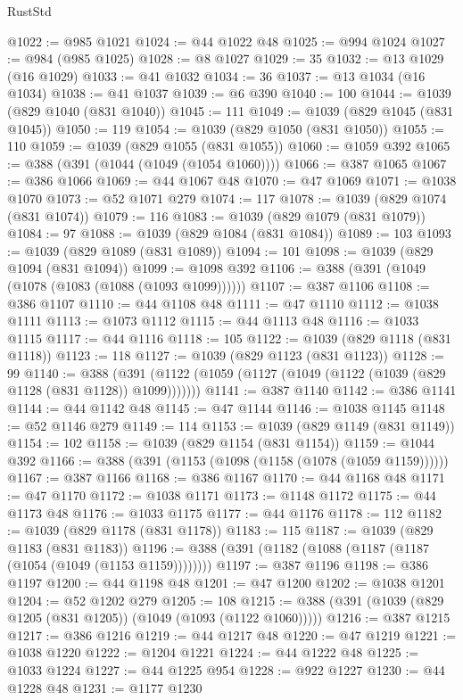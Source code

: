 \begin{lexlean}{RustStd}
\begin{coremodule}
@1022 := @985 @1021
@1024 := @44 @1022 @48
@1025 := @994 @1024
@1027 := @984 (@985 @1025)
@1028 := @8 @1027
@1029 := 35
@1032 := @13 @1029 (@16 @1029)
@1033 := @41 @1032
@1034 := 36
@1037 := @13 @1034 (@16 @1034)
@1038 := @41 @1037
@1039 := @6 @390
@1040 := 100
@1044 := @1039 (@829 @1040 (@831 @1040))
@1045 := 111
@1049 := @1039 (@829 @1045 (@831 @1045))
@1050 := 119
@1054 := @1039 (@829 @1050 (@831 @1050))
@1055 := 110
@1059 := @1039 (@829 @1055 (@831 @1055))
@1060 := @1059 @392
@1065 := @388 (@391 (@1044 (@1049 (@1054 @1060))))
@1066 := @387 @1065
@1067 := @386 @1066
@1069 := @44 @1067 @48
@1070 := @47 @1069
@1071 := @1038 @1070
@1073 := @52 @1071 @279
@1074 := 117
@1078 := @1039 (@829 @1074 (@831 @1074))
@1079 := 116
@1083 := @1039 (@829 @1079 (@831 @1079))
@1084 := 97
@1088 := @1039 (@829 @1084 (@831 @1084))
@1089 := 103
@1093 := @1039 (@829 @1089 (@831 @1089))
@1094 := 101
@1098 := @1039 (@829 @1094 (@831 @1094))
@1099 := @1098 @392
@1106 := @388 (@391 (@1049 (@1078 (@1083 (@1088 (@1093 @1099))))))
@1107 := @387 @1106
@1108 := @386 @1107
@1110 := @44 @1108 @48
@1111 := @47 @1110
@1112 := @1038 @1111
@1113 := @1073 @1112
@1115 := @44 @1113 @48
@1116 := @1033 @1115
@1117 := @44 @1116
@1118 := 105
@1122 := @1039 (@829 @1118 (@831 @1118))
@1123 := 118
@1127 := @1039 (@829 @1123 (@831 @1123))
@1128 := 99
@1140 := @388 (@391 (@1122 (@1059 (@1127 (@1049 (@1122 (@1039 (@829 @1128 (@831 @1128)) @1099)))))))
@1141 := @387 @1140
@1142 := @386 @1141
@1144 := @44 @1142 @48
@1145 := @47 @1144
@1146 := @1038 @1145
@1148 := @52 @1146 @279
@1149 := 114
@1153 := @1039 (@829 @1149 (@831 @1149))
@1154 := 102
@1158 := @1039 (@829 @1154 (@831 @1154))
@1159 := @1044 @392
@1166 := @388 (@391 (@1153 (@1098 (@1158 (@1078 (@1059 @1159))))))
@1167 := @387 @1166
@1168 := @386 @1167
@1170 := @44 @1168 @48
@1171 := @47 @1170
@1172 := @1038 @1171
@1173 := @1148 @1172
@1175 := @44 @1173 @48
@1176 := @1033 @1175
@1177 := @44 @1176
@1178 := 112
@1182 := @1039 (@829 @1178 (@831 @1178))
@1183 := 115
@1187 := @1039 (@829 @1183 (@831 @1183))
@1196 := @388 (@391 (@1182 (@1088 (@1187 (@1187 (@1054 (@1049 (@1153 @1159))))))))
@1197 := @387 @1196
@1198 := @386 @1197
@1200 := @44 @1198 @48
@1201 := @47 @1200
@1202 := @1038 @1201
@1204 := @52 @1202 @279
@1205 := 108
@1215 := @388 (@391 (@1039 (@829 @1205 (@831 @1205)) (@1049 (@1093 (@1122 @1060)))))
@1216 := @387 @1215
@1217 := @386 @1216
@1219 := @44 @1217 @48
@1220 := @47 @1219
@1221 := @1038 @1220
@1222 := @1204 @1221
@1224 := @44 @1222 @48
@1225 := @1033 @1224
@1227 := @44 @1225 @954
@1228 := @922 @1227
@1230 := @44 @1228 @48
@1231 := @1177 @1230

\end{coremodule}
\end{lexlean}
